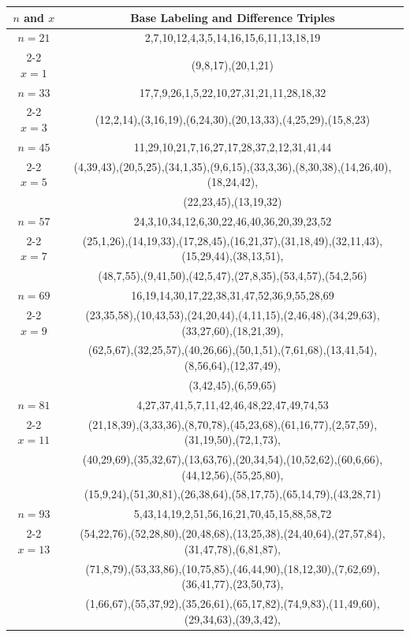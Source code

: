 \begin{tabular}{| c | c |}
\hline
\(n\) and \(x\) & Base Labeling and Difference Triples\\
\hline
\(n=21\) & 
2,7,10,12,4,3,5,14,16,15,6,11,13,18,19\\
\cline{2-2}
\(x=1\)
&(9,8,17),(20,1,21)\\
\hline 
\(n=33\) & 
17,7,9,26,1,5,22,10,27,31,21,11,28,18,32\\
\cline{2-2}
\(x=3\)
&(12,2,14),(3,16,19),(6,24,30),(20,13,33),(4,25,29),(15,8,23)\\
\hline 
\(n=45\) & 
11,29,10,21,7,16,27,17,28,37,2,12,31,41,44\\
\cline{2-2}
\(x=5\)
&(4,39,43),(20,5,25),(34,1,35),(9,6,15),(33,3,36),(8,30,38),(14,26,40),(18,24,42),\\
&(22,23,45),(13,19,32)\\
\hline 
\(n=57\) & 
24,3,10,34,12,6,30,22,46,40,36,20,39,23,52\\
\cline{2-2}
\(x=7\)
&(25,1,26),(14,19,33),(17,28,45),(16,21,37),(31,18,49),(32,11,43),(15,29,44),(38,13,51),\\
&(48,7,55),(9,41,50),(42,5,47),(27,8,35),(53,4,57),(54,2,56)\\
\hline 
\(n=69\) & 
16,19,14,30,17,22,38,31,47,52,36,9,55,28,69\\
\cline{2-2}
\(x=9\)
&(23,35,58),(10,43,53),(24,20,44),(4,11,15),(2,46,48),(34,29,63),(33,27,60),(18,21,39),\\
&(62,5,67),(32,25,57),(40,26,66),(50,1,51),(7,61,68),(13,41,54),(8,56,64),(12,37,49),\\
&(3,42,45),(6,59,65)\\
\hline 
\(n=81\) & 
4,27,37,41,5,7,11,42,46,48,22,47,49,74,53\\
\cline{2-2}
\(x=11\)
&(21,18,39),(3,33,36),(8,70,78),(45,23,68),(61,16,77),(2,57,59),(31,19,50),(72,1,73),\\
&(40,29,69),(35,32,67),(13,63,76),(20,34,54),(10,52,62),(60,6,66),(44,12,56),(55,25,80),\\
&(15,9,24),(51,30,81),(26,38,64),(58,17,75),(65,14,79),(43,28,71)\\
\hline 
\(n=93\) & 
5,43,14,19,2,51,56,16,21,70,45,15,88,58,72\\
\cline{2-2}
\(x=13\)
&(54,22,76),(52,28,80),(20,48,68),(13,25,38),(24,40,64),(27,57,84),(31,47,78),(6,81,87),\\
&(71,8,79),(53,33,86),(10,75,85),(46,44,90),(18,12,30),(7,62,69),(36,41,77),(23,50,73),\\
&(1,66,67),(55,37,92),(35,26,61),(65,17,82),(74,9,83),(11,49,60),(29,34,63),(39,3,42),\\

\end{tabular}
